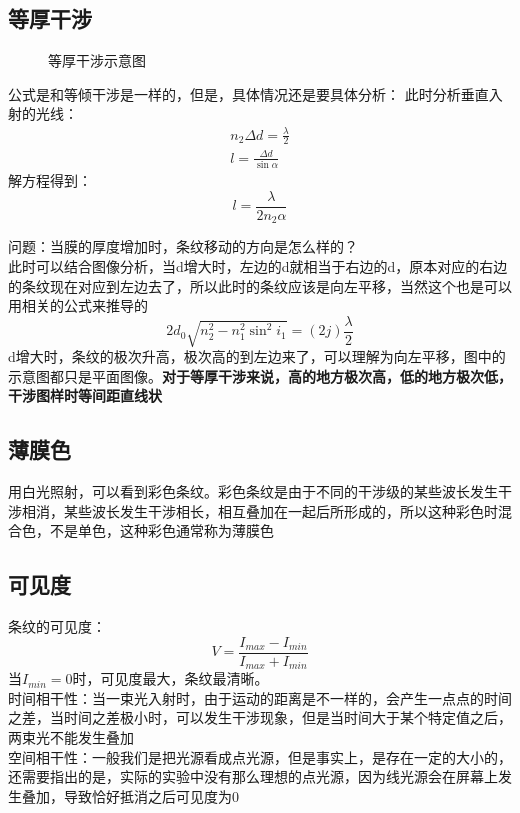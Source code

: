 \documentclass[UFT8]{article}
\begin{document}
\subsection{等厚干涉}
\begin{figure}[htbp]
\begin{center}
\end{center}
\caption{等厚干涉示意图}
\end{figure}
公式是和等倾干涉是一样的，但是，具体情况还是要具体分析：
此时分析垂直入射的光线：
\begin{gather*}
n_2\Delta d=\frac{\lambda}{2}\\
l=\frac{\Delta d}{\sin \alpha}
\end{gather*}
解方程得到：
\[
	l=\frac{\lambda}{2n_2\alpha}
\]

问题：当膜的厚度增加时，条纹移动的方向是怎么样的？\\
此时可以结合图像分析，当d增大时，左边的d就相当于右边的d，原本对应的右边的条纹现在对应到左边去了，所以此时的条纹应该是向左平移，当然这个也是可以用相关的公式来推导的
\[
	2d_0\sqrt{n_{2}^{2}-n_{1}^{2}\sin^2 i_1}=(2j)\frac{\lambda  }{2}
\]
d增大时，条纹的极次升高，极次高的到左边来了，可以理解为向左平移，图中的示意图都只是平面图像。\textbf{对于等厚干涉来说，高的地方极次高，低的地方极次低，干涉图样时等间距直线状}
\subsection{薄膜色}
用白光照射，可以看到彩色条纹。彩色条纹是由于不同的干涉级的某些波长发生干涉相消，某些波长发生干涉相长，相互叠加在一起后所形成的，所以这种彩色时混合色，不是单色，这种彩色通常称为薄膜色
\subsection{可见度}
条纹的可见度：
\[
	V=\frac{I_{max}-I_{min}}{I_{max}+I_{min}}
\]
当$I_{min}=0$时，可见度最大，条纹最清晰。\\
时间相干性：当一束光入射时，由于运动的距离是不一样的，会产生一点点的时间之差，当时间之差极小时，可以发生干涉现象，但是当时间大于某个特定值之后，两束光不能发生叠加\\
空间相干性：一般我们是把光源看成点光源，但是事实上，是存在一定的大小的，还需要指出的是，实际的实验中没有那么理想的点光源，因为线光源会在屏幕上发生叠加，导致恰好抵消之后可见度为0
\end{document}
